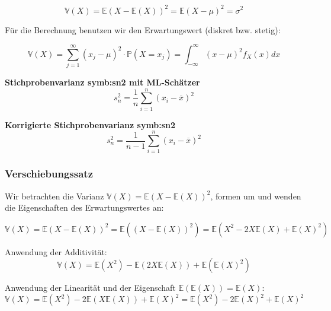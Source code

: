 {\begin{definition}
    \[\mathbb V\left(X\right)=\mathbb E\left(X-\mathbb E\left(X\right)\right)^{2}=\mathbb E\left(X-\mu\right)^{2}=\sigma ^{2}\]
    \end{definition}

    Für die Berechnung benutzen wir den Erwartungswert (diskret bzw. stetig):

    \[\mathbb V\left(X\right)=\sum_{j=1}^{{\infty}}{\left(x_{j}-\mu\right)^{2}\cdot \mathbb P\left(X=x_{j}\right)}=
    \int_{-{\infty}}^{{\infty}}{\left(x-\mu \right)^{2}f_{X}(x)}dx\]

    \begin{definition}\textbf{Stichprobenvarianz \gls{symb:sn2} mit ML-Schätzer}
        \label{def:stichprobenvarianz}%
        \[s_n^2= \frac{1}{n} \sum_{i=1}^n\left(x_i-\overline x\right)^2\]
    \end{definition}

    \begin{definition}\textbf{Korrigierte Stichprobenvarianz \gls{symb:sn2}}
        \label{def:korrigierte_stichprobenvarianz}%
        \[s_n^2= \frac{1}{n-1} \sum_{i=1}^n\left(x_i-\overline x\right)^2\]
    \end{definition}

    \subsubsection{Verschiebungssatz}
    Wir betrachten die Varianz $\mathbb V\left(X\right)=\mathbb E\left(X-\mathbb E\left(X\right)\right)^{2}$,
    formen um und wenden die Eigenschaften des Erwartungswertes an:

    \[\mathbb V\left(X\right)=\mathbb E\left(X-\mathbb E\left(X\right)\right)^{2}=
        \mathbb E\left(\left(X-\mathbb E\left(X\right)\right)^{2}\right)=
        \mathbb E\left(X^{2}-2X\mathbb E\left(X\right)+\mathbb E\left(X\right)^{2}\right)\]

    Anwendung der Additivität:
    \[\mathbb V\left(X\right)=\mathbb E\left(X^{2}\right)-\mathbb E\left(2X\mathbb E\left(X\right)\right)+\mathbb E\left(\mathbb E\left(X\right)^{2}\right)\]

    Anwendung der Linearität und der Eigenschaft $\mathbb E\left(\mathbb E\left(X\right)\right)=\mathbb E(X)$:
    \[\mathbb V\left(X\right)=\mathbb E\left(X^{2}\right)-2\mathbb E\left(X\mathbb E\left(X\right)\right)+\mathbb E\left(X\right)^{2}=
        \mathbb E\left(X^{2}\right)-2\mathbb E\left(X\right)^{2}+\mathbb E\left(X\right)^{2}\]

}

